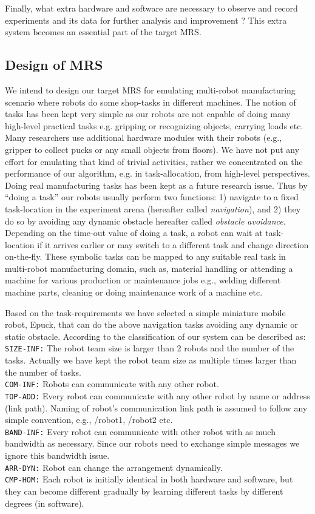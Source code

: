 Finally, what extra hardware and software are necessary to observe and record experiments  and its data for further analysis and improvement ? This extra system becomes an essential part of the target MRS. 
\subsection{Design of MRS}
\label{expt-tools:mrs-design}
We intend to design our target MRS for emulating multi-robot manufacturing scenario where robots do some shop-tasks in different machines. The notion of tasks has been kept very simple as our robots are not  capable of doing many high-level practical tasks e.g. gripping or recognizing objects, carrying  loads etc. Many researchers use additional hardware modules with their robots (e.g., gripper to collect pucks or any small objects from floors). We have not put any effort for emulating that kind of trivial activities, rather we concentrated on the performance of our algorithm, e.g. in task-allocation, from high-level perspectives. Doing real manufacturing tasks has been kept as a future research issue. Thus by ``doing a task'' our robots usually perform two functions: 1) navigate to a fixed task-location in the experiment arena (hereafter called {\em navigation}), and 2) they do so by avoiding any dynamic obstacle {hereafter called {\em obstacle avoidance}}.  Depending on the time-out value of doing a task, a robot can wait at task-location if it arrives earlier or may switch to a different task and change direction on-the-fly. These symbolic tasks can be mapped to any suitable real task in multi-robot manufacturing domain, such as, material handling or attending a machine for various production or maintenance jobs e.g., welding different machine parts, cleaning or doing maintenance work of a machine etc.

Based on the task-requirements we have selected a simple miniature mobile robot, Epuck, that can do the above navigation tasks  avoiding any dynamic or static obstacle. According to the classification of \cite{Dudek+1996} our system can be described as:\\
\texttt{SIZE-INF:} The robot team size is larger than  2 robots and the number of the tasks. Actually we have kept the robot team size as multiple times larger than the number of tasks.\\
\texttt{COM-INF:} Robots can communicate with any other robot.\\
\texttt{TOP-ADD:} Every robot can communicate with any other robot by name or address (link path). Naming of robot's communication link path is assumed to follow any simple convention, e.g., /robot1, /robot2 etc.\\
\texttt{BAND-INF:} Every robot can communicate with other robot with as much bandwidth as necessary. Since our robots need to exchange simple messages we ignore this bandwidth issue.\\
\texttt{ARR-DYN:} Robot can change the arrangement dynamically.\\
\texttt{CMP-HOM:} Each robot is initially identical in both hardware and software, but they can become different gradually by learning different tasks by different degrees (in software).

